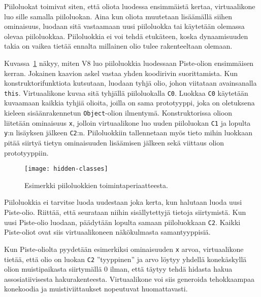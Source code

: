 Piiloluokat toimivat siten, että oliota luodessa ensimmäistä kertaa, virtuaalikone luo sille samalla piiloluokan. Aina kun oliota muutetaan lisäämällä siihen ominaisuus, luodaan sitä vastaamaan uusi piiloluokka tai käytetään olemassa olevaa piiloluokkaa. Piiloluokkia ei voi tehdä etukäteen, koska dynaamisuuden takia on vaikea tietää ennalta millainen olio tulee rakenteeltaan olemaan. 

Kuvassa~\ref{fig:hiddenclass} näkyy, miten V8 luo piiloluokkia luodessaan Piste-olion ensimmäisen kerran. Jokainen kaavion askel vastaa yhden koodirivin suorittamista. Kun konstruktorifunktiota kutsutaan, luodaan tyhjä olio, johon viitataan avainsanalla \texttt{this}. Virtuaalikone kuvaa sitä tyhjällä piiloluokalla \texttt{C0}. Luokkaa \texttt{C0} käytetään kuvaamaan kaikkia tyhjiä olioita, joilla on sama prototyyppi, joka on oletuksena kieleen sisäänrakennetun \texttt{Object}-olion ilmentymä. Konstruktorissa olioon liitetään ominaisuus \texttt{x}, jolloin virtuaalikone luo uuden piiloluokan \texttt{C1} ja lopulta \texttt{y}:n lisäyksen jälkeen \texttt{C2}:n. Piiloluokkiin tallennetaan myös tieto mihin luokkaan pitää siirtyä tietyn ominaisuuden lisäämisen jälkeen sekä viittaus olion prototyyppiin.

\begin{figure}[ht]
    \texttt{[image: hidden-classes]}
    \caption{Esimerkki piiloluokkien toimintaperiaatteesta.}
     \centering
     \label{fig:hiddenclass}
\end{figure}

Piiloluokkia ei tarvitse luoda uudestaan joka kerta, kun halutaan luoda uusi Piste-olio. Riittää, että seurataan niihin sisällytettyjä tietoja siirtymistä. Kun uusi Piste-olio luodaan, päädytään lopulta samaan piiloluokkaan \texttt{C2}. Kaikki Piste-oliot ovat siis virtuaalikoneen näkökulmasta samantyyppisiä.

Kun Piste-oliolta pyydetään esimerkiksi ominaisuuden \texttt{x} arvoa, virtuaalikone tietää, että olio on luokan \texttt{C2} ''tyyppinen'' ja arvo löytyy yhdellä konekäskyllä olion muistipaikasta siirtymällä 0 ilman, että täytyy tehdä hidasta hakua assosiatiivisesta hakurakenteesta. Virtuaalikone voi siis generoida tehokkaampaa konekoodia ja muistiviittaukset nopeutuvat huomattavasti.


